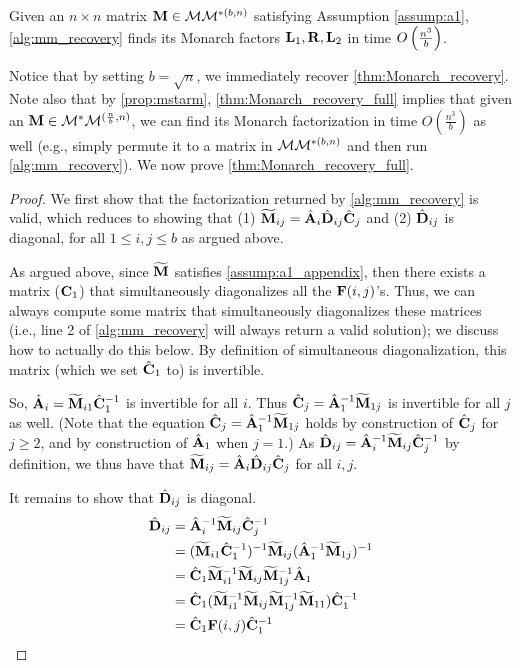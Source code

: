 \begin{theorem}\label{thm:Monarch_recovery_full}
Given an $n \times n$ matrix $\mathbf{M} \in \mathcal{M}\mathcal{M}^{*(b,n)}$ satisfying Assumption \ref{assump:a1}, \cref{alg:mm_recovery} finds its Monarch factors $\mathbf{L}_1, \mathbf{R}, \mathbf{L}_2$ in  time $O\left( \frac{n^3}{b} \right)$.
\end{theorem}

Notice that by setting $b = \sqrt{n}$, we immediately recover \cref{thm:Monarch_recovery}.
Note also that by \cref{prop:mstarm}, \cref{thm:Monarch_recovery_full} implies that given an $\mathbf{M} \in \mathcal{M}^*\mathcal{M}^{(\frac{n}{b},n)}$, we can find its Monarch factorization in time $O(\frac{n^3}{b})$ as well (e.g., simply permute it to a matrix in $\mathcal{M}\mathcal{M}^{*(b,n)}$ and then run \cref{alg:mm_recovery}). 
We now prove \cref{thm:Monarch_recovery_full}.

\begin{proof}
We first show that the factorization returned by \cref{alg:mm_recovery} is valid, which reduces to showing that (1) $\widetilde{\mathbf{M}}_{ij} = \hat{\mathbf{A}}_i \hat{\mathbf{D}}_{ij} \hat{\mathbf{C}}_j$ and (2) $\hat{\mathbf{D}}_{ij}$ is diagonal, for all $1 \le i, j \le b$ as argued above.

As argued above, since $\widetilde{\mathbf{M}}$ satisfies \cref{assump:a1_appendix}, then there exists a matrix ($\mathbf{C}_1$) that simultaneously diagonalizes all the $\mathbf{F}(i,j)$'s. Thus, we can always compute some matrix that simultaneously diagonalizes these matrices (i.e., line 2 of \cref{alg:mm_recovery} will always return a valid solution); we discuss how to actually do this below. By definition of simultaneous diagonalization, this matrix (which we set $\hat{\mathbf{C}}_1$ to) is invertible.

So, $\hat{\mathbf{A}}_i = \widetilde{\mathbf{M}}_{i1}\hat{\mathbf{C}}_1^{-1}$ is invertible for all $i$. Thus $\hat{\mathbf{C}}_j = \hat{\mathbf{A}}_1^{-1} \widetilde{\mathbf{M}}_{1j}$ is invertible for all $j$ as well. (Note that the equation $\hat{\mathbf{C}}_j = \hat{\mathbf{A}}_1^{-1} \widetilde{\mathbf{M}}_{1j}$ holds by construction of $\hat{\mathbf{C}}_j$ for $j \ge 2$, and by construction of $\hat{\mathbf{A}}_1$ when $j = 1$.) As $\hat{\mathbf{D}}_{ij} = \hat{\mathbf{A}}_i^{-1} \widetilde{\mathbf{M}}_{ij}\hat{\mathbf{C}}_j^{-1}$ by definition, we thus have that $\widetilde{\mathbf{M}}_{ij} = \hat{\mathbf{A}}_i \hat{\mathbf{D}}_{ij} \hat{\mathbf{C}}_j$ for all $i, j$.

It remains to show that $\hat{\mathbf{D}}_{ij}$ is diagonal.
\begin{align*}
\hat{\vD}_{ij} &= \hat{\vA}_i^{-1} \MM_{ij}\hat{\vC}_j^{-1} \\
&= (\MM_{i1} \hat{\vC}_1^{-1})^{-1} \MM_{ij} (\hat{\vA}_1^{-1} \MM_{1j})^{-1} \\
&= \hat{\vC}_1 \MM_{i1}^{-1} \MM_{ij} \MM_{1j}^{-1} \hat{\vA}_1  \\
&= \hat{\vC}_1 (\MM_{i1}^{-1} \MM_{ij} \MM_{1j}^{-1} \MM_{11}) \hat{\vC}_1^{-1} \\
&= \hat{\vC}_1 \vF(i, j) \hat{\vC}_1^{-1}%
\end{align*}


\end{proof}
